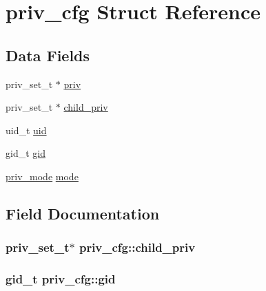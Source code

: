 \hypertarget{structpriv__cfg}{}\section{priv\+\_\+cfg Struct Reference}
\label{structpriv__cfg}
\subsection*{Data Fields}
\begin{DoxyCompactItemize}
\item 
priv\+\_\+set\+\_\+t $\ast$ \hyperlink{structpriv__cfg_a78b4feea0537e18a7b645f4a75e1a95b}{priv}
\item 
priv\+\_\+set\+\_\+t $\ast$ \hyperlink{structpriv__cfg_a88d44327b4e9c91d7ade04492b6080d8}{child\+\_\+priv}
\item 
uid\+\_\+t \hyperlink{structpriv__cfg_a73fa44a599cf53883f0d41a192c31978}{uid}
\item 
gid\+\_\+t \hyperlink{structpriv__cfg_a2e3ab9c1054612977cc0d900a79872e5}{gid}
\item 
\hyperlink{mod__privileges_8c_a8d87ee50f52a9b97e8822a782e862596}{priv\+\_\+mode} \hyperlink{structpriv__cfg_a364aacc1c74c16ef3a126c1855ef8d09}{mode}
\end{DoxyCompactItemize}


\subsection{Field Documentation}
\subsubsection[{\texorpdfstring{child\+\_\+priv}{child_priv}}]{\setlength{\rightskip}{0pt plus 5cm}priv\+\_\+set\+\_\+t$\ast$ priv\+\_\+cfg\+::child\+\_\+priv}\hypertarget{structpriv__cfg_a88d44327b4e9c91d7ade04492b6080d8}{}\label{structpriv__cfg_a88d44327b4e9c91d7ade04492b6080d8}
\subsubsection[{\texorpdfstring{gid}{gid}}]{\setlength{\rightskip}{0pt plus 5cm}gid\+\_\+t priv\+\_\+cfg\+::gid}\hypertarget{structpriv__cfg_a2e3ab9c1054612977cc0d900a79872e5}{}\label{structpriv__cfg_a2e3ab9c1054612977cc0d900a79872e5}
